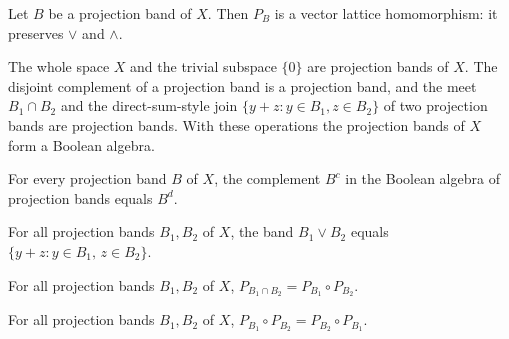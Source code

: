 \begin{lemma}
\label{lem:projectionBand-bandProjection-isVecLatHom}
\leanok
{}
Let $B$ be a projection band of $X$. Then $P_B$ is a vector lattice
homomorphism: it preserves $\vee$ and $\wedge$.
\end{lemma}

\begin{lemma}
\label{lem:projectionBand-booleanAlgebra}
\leanok
{}
The whole space $X$ and the trivial subspace $\{0\}$ are projection
bands of $X$. The disjoint complement of a projection band is a
projection band, and the meet $B_1 \cap B_2$ and the
direct-sum-style join $\{y + z : y \in B_1, z \in B_2\}$ of two
projection bands are projection bands. With these operations the
projection bands of $X$ form a Boolean algebra.
\end{lemma}

\begin{lemma}
\label{lem:projectionBand-coe-compl}
\leanok
{}
For every projection band $B$ of $X$, the complement $B^c$ in the
Boolean algebra of projection bands equals $B^d$.
\end{lemma}

\begin{lemma}
\label{lem:projectionBand-coe-band-sup-eq-add}
\leanok
{}
For all projection bands $B_1, B_2$ of $X$, the band $B_1 \vee B_2$
equals $\{y + z : y \in B_1,\, z \in B_2\}$.
\end{lemma}

\begin{lemma}
\label{lem:projectionBand-bandProjection-inf}
\leanok
{}
For all projection bands $B_1, B_2$ of $X$,
$P_{B_1 \cap B_2} = P_{B_1} \circ P_{B_2}$.
\end{lemma}

\begin{lemma}
\label{lem:projectionBand-bandProjection-comm}
\leanok
{}
For all projection bands $B_1, B_2$ of $X$,
$P_{B_1} \circ P_{B_2} = P_{B_2} \circ P_{B_1}$.
\end{lemma}

